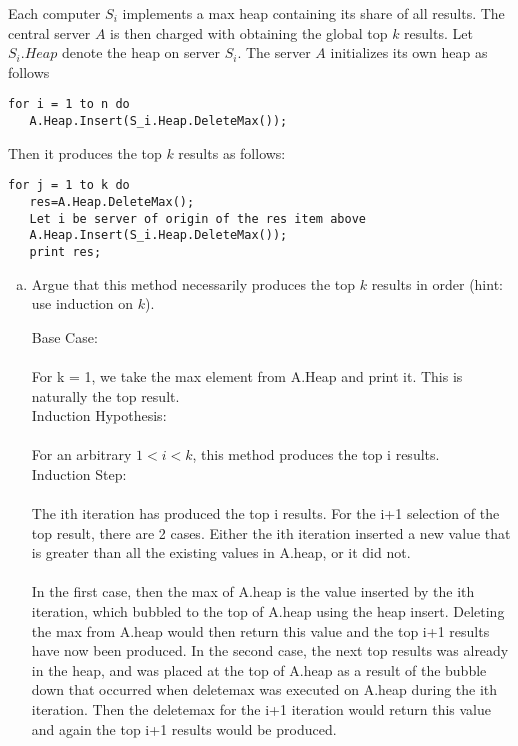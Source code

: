 \documentclass[12pt]{article}
\begin{document}
Each computer $S_i$ implements a max heap containing its share of all results. The
central server $A$ is then charged with obtaining the global top $k$ results. Let $S_i.Heap$ denote the heap on server
$S_i$. The server $A$ initializes its own heap as follows

\begin{verbatim}
for i = 1 to n do
   A.Heap.Insert(S_i.Heap.DeleteMax());
\end{verbatim}
Then it produces the top $k$ results as follows:

\begin{verbatim}
for j = 1 to k do
   res=A.Heap.DeleteMax();
   Let i be server of origin of the res item above
   A.Heap.Insert(S_i.Heap.DeleteMax());
   print res;
\end{verbatim}
\begin{enumerate}[(a)]
\item Argue that this method necessarily produces the top $k$ results in order
(hint: use induction on $k$).

Base Case:\\\\
For k = 1, we take the max element from A.Heap and print it. This is naturally the top result.\\
Induction Hypothesis:\\\\
For an arbitrary $1 < i < k$, this method produces the top i results.\\
Induction Step:\\\\
The ith iteration has produced the top i results. For the i+1 selection of the top result, there are 2 cases. Either the ith iteration inserted a new value that is greater than all the existing values in A.heap, or it did not. \\\\In the first case, then the max of A.heap is the value inserted by the ith iteration, which bubbled to the top of A.heap using the heap insert. Deleting the max from A.heap would then return this value and the top i+1 results have now been produced. In the second case, the next top results was already in the heap, and was placed at the top of A.heap as a result of the bubble down that occurred when deletemax was executed on A.heap during the ith iteration. Then the deletemax for the i+1 iteration would return this value and again the top i+1 results would be produced.\\


\end{enumerate}
\end{document}
